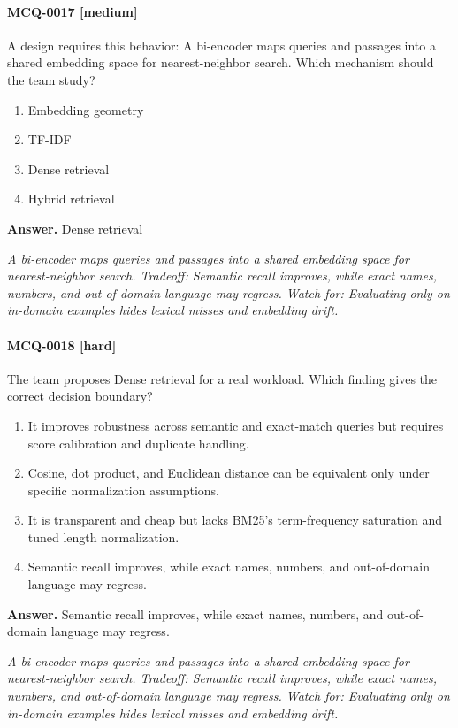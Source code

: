 \paragraph{MCQ-0017 [medium]} A design requires this behavior: A bi-encoder maps queries and passages into a shared embedding space for nearest-neighbor search. Which mechanism should the team study?
\begin{enumerate}[label=\Alph*.]
\item Embedding geometry
\item TF-IDF
\item Dense retrieval
\item Hybrid retrieval
\end{enumerate}
\noindent\textbf{Answer.} Dense retrieval
\par\textit{A bi-encoder maps queries and passages into a shared embedding space for nearest-neighbor search. Tradeoff: Semantic recall improves, while exact names, numbers, and out-of-domain language may regress. Watch for: Evaluating only on in-domain examples hides lexical misses and embedding drift.}
\paragraph{MCQ-0018 [hard]} The team proposes Dense retrieval for a real workload. Which finding gives the correct decision boundary?
\begin{enumerate}[label=\Alph*.]
\item It improves robustness across semantic and exact-match queries but requires score calibration and duplicate handling.
\item Cosine, dot product, and Euclidean distance can be equivalent only under specific normalization assumptions.
\item It is transparent and cheap but lacks BM25's term-frequency saturation and tuned length normalization.
\item Semantic recall improves, while exact names, numbers, and out-of-domain language may regress.
\end{enumerate}
\noindent\textbf{Answer.} Semantic recall improves, while exact names, numbers, and out-of-domain language may regress.
\par\textit{A bi-encoder maps queries and passages into a shared embedding space for nearest-neighbor search. Tradeoff: Semantic recall improves, while exact names, numbers, and out-of-domain language may regress. Watch for: Evaluating only on in-domain examples hides lexical misses and embedding drift.}
